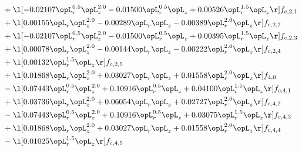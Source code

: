 \begin{alignat}{2}
& + \l[  -0.02107 \opL_r^{0.5} \opL_z^{2.0}   -0.01500 \opL_r^{0.5} \opL_z +  0.00526 \opL_r^{1.5} \opL_z  \r] f_{c,2,1} \nonumber \\ 
& + \l[  0.00155 \opL_r \opL_z^{2.0}   -0.00289 \opL_r \opL_z   -0.00389 \opL_r^{2.0} \opL_z  \r] f_{c,2,2} \nonumber \\ 
& + \l[  -0.02107 \opL_r^{0.5} \opL_z^{2.0}   -0.01500 \opL_r^{0.5} \opL_z +  0.00395 \opL_r^{1.5} \opL_z  \r] f_{c,2,3} \nonumber \\ 
& + \l[  0.00078 \opL_r \opL_z^{2.0}   -0.00144 \opL_r \opL_z   -0.00222 \opL_r^{2.0} \opL_z  \r] f_{c,2,4} \nonumber \\ 
& + \l[  0.00132 \opL_r^{1.5} \opL_z  \r] f_{c,2,5} \nonumber \\ 
& + \l[  0.01868 \opL_r \opL_z^{2.0} +  0.03027 \opL_r \opL_z +  0.01558 \opL_r^{2.0} \opL_z  \r] f_{4,0} \nonumber \\ 
& - \l[  0.07443 \opL_r^{0.5} \opL_z^{2.0} +  0.10916 \opL_r^{0.5} \opL_z +  0.04100 \opL_r^{1.5} \opL_z  \r] f_{c,4,1} \nonumber \\ 
& + \l[  0.03736 \opL_r \opL_z^{2.0} +  0.06054 \opL_r \opL_z +  0.02727 \opL_r^{2.0} \opL_z  \r] f_{c,4,2} \nonumber \\ 
& - \l[  0.07443 \opL_r^{0.5} \opL_z^{2.0} +  0.10916 \opL_r^{0.5} \opL_z +  0.03075 \opL_r^{1.5} \opL_z  \r] f_{c,4,3} \nonumber \\ 
& + \l[  0.01868 \opL_r \opL_z^{2.0} +  0.03027 \opL_r \opL_z +  0.01558 \opL_r^{2.0} \opL_z  \r] f_{c,4,4} \nonumber \\ 
& - \l[  0.01025 \opL_r^{1.5} \opL_z  \r] f_{c,4,5} \nonumber \\ 
\end{alignat} 


